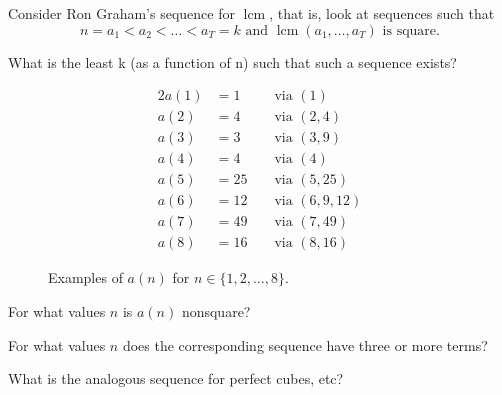 \documentclass{article}
\begin{document}
  Consider Ron Graham's sequence for $\operatorname{lcm}$, that is, look at sequences such that \[
    n = a_1 < a_2 < \hdots < a_T = k \text{ and } \operatorname{lcm}(a_1,\hdots,a_T) \text{ is square.}
  \]
\begin{question}
  What is the least k (as a function of n) such that such a sequence exists?
\end{question}
\begin{figure}[!h]
  \centering
  \begin{alignat*}{2}
  a(1) &= 1  &&\text{ via } (1)\\
  a(2) &= 4  &&\text{ via } (2, 4)\\
  a(3) &= 3  &&\text{ via } (3, 9)\\
  a(4) &= 4  &&\text{ via } (4)\\
  a(5) &= 25 &&\text{ via } (5, 25)\\
  a(6) &= 12 &&\text{ via } (6, 9, 12)\\
  a(7) &= 49 &&\text{ via } (7, 49)\\
  a(8) &= 16 &&\text{ via } (8, 16)
  \end{alignat*}
  \caption{
    Examples of $a(n)$ for $n \in \{1, 2,\hdots,8\}$.
  }
\end{figure}

\begin{related}
  \item For what values $n$ is $a(n)$ nonsquare?
  \item For what values $n$ does the corresponding sequence have three or more terms?
  \item What is the analogous sequence for perfect cubes, etc?
\end{related}
\end{document}
